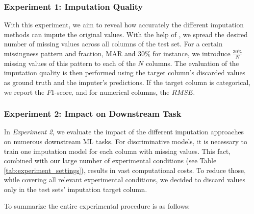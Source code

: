 \subsubsection{Experiment 1: Imputation Quality}
\label{sec:experiment_1}
%
With this experiment, we aim to reveal how accurately the different imputation methods can impute the original values. 
With the help of , we spread the desired number of missing values across all columns of the test set. For a certain missingness pattern and fraction, MAR and $30\%$ for instance, we introduce $\frac{30\%}{N}$ missing values of this pattern to each of the $N$ columns.
%
The evaluation of the imputation quality is then performed using the target column's discarded values as ground truth and the imputer's predictions. If the target column is categorical, we report the $F1$-score, and for numerical columns, the $RMSE$.


\subsubsection{Experiment 2: Impact on Downstream Task}
\label{sec:experiment_2}
%
In \emph{Experiment 2}, we evaluate the impact of the different imputation approaches on numerous downstream ML tasks. For discriminative models, it is necessary to train one imputation model for each column with missing values. This fact, combined with our large number of experimental conditions (see Table \ref{tab:experiment_settings}), results in vast computational costs. To reduce those, while covering all relevant experimental conditions, we decided to discard values only in the test sets’ imputation target column. 

To summarize the entire experimental procedure is as follows:

